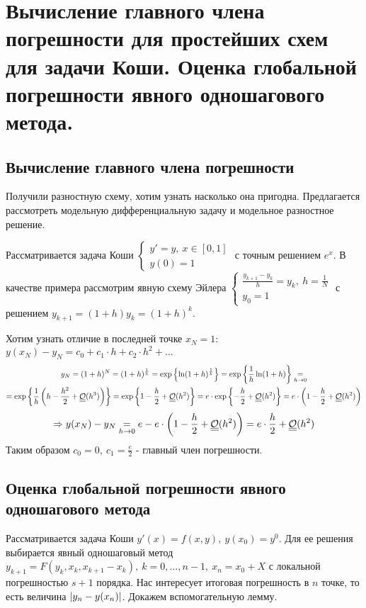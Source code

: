 \section{Вычисление главного члена погрешности для простейших схем для задачи Коши. Оценка глобальной погрешности явного одношагового метода.}

\subsection*{Вычисление главного члена погрешности}

Получили разностную схему, хотим узнать насколько она пригодна.
Предлагается рассмотреть модельную дифференциальную задачу
и модельное разностное решение.

Рассматривается задача Коши $\begin{cases}y'=y,\ x\in[0,1] \\ y(0)=1\end{cases}$
с точным решением $e^x$.
В качестве примера рассмотрим явную схему Эйлера
$\begin{cases}\frac{y_{k+1}-y_{k}}{h}=y_k,\ h=\frac{1}{N} \\ y_0=1\end{cases}$
с решением $y_{k+1}=(1+h)y_k=(1+h)^k$.

Хотим узнать отличие в последней точке $x_N=1$: $y(x_N)-y_N=c_0+c_1\cdot h+c_2\cdot h^2+\ldots$
\begin{multline*}
  y_N=(1+h)^N=(1+h)^{\frac{1}{h}}=\exp\left\{\ln(1+h)^{\frac{1}{h}}\right\}=\exp\left\{\frac{1}{h}\ln(1+h)\right\}\underset{h\rightarrow0}{=}\\
  = \exp\left\{\frac{1}{h}\left(h-\frac{h^2}{2}+\underline{\underline{\mathcal{O}}}(h^3)\right)\right\}
  = \exp\left\{1-\frac{h}{2}+\underline{\underline{\mathcal{O}}}(h^2)\right\}=e\cdot\exp\left\{-\frac{h}{2}+\underline{\underline{\mathcal{O}}}(h^2)\right\}=e\cdot\left(1-\frac{h}{2}+\underline{\underline{\mathcal{O}}}(h^2)\right)
\end{multline*}
\[\Rightarrow y(x_N)-y_N\underset{h\rightarrow0}{=}e-e\cdot\left(1-\frac{h}{2}+\underline{\underline{\mathcal{O}}}(h^2)\right)=e\cdot\frac{h}{2}+\underline{\underline{\mathcal{O}}}(h^2)\]
Таким образом $c_0=0,\ c_1=\frac{e}{2}$ - главный член погрешности.

\subsection*{Оценка глобальной погрешности явного одношагового метода}

Рассматривается задача Коши $y'(x)=f(x,y),\ y(x_0)=y^0$.
Для ее решения выбирается явный одношаговый метод
$y_{k+1}=F(y_k, x_k, x_{k+1}-x_{k}),\ k=0,\ldots,n-1,\ x_n=x_0+X$ с локальной погрешностью $s+1$ порядка.
Нас интересует итоговая погрешность в $n$ точке, то есть величина $\left\lvert y_n-y(x_n)\right\rvert$.
Докажем вспомогательную лемму.

